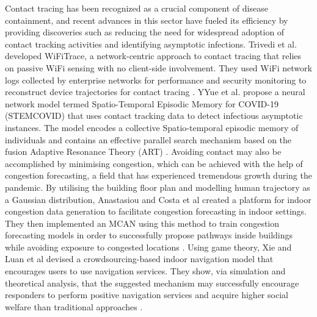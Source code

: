 \documentclass[acmtog]{acmart}
\begin{document}
Contact tracing has been recognized as a crucial component of disease containment, and recent advances in this sector have fueled its efficiency by providing discoveries such as reducing the need for widespread adoption of contact tracking activities and identifying asymptotic infections. Trivedi et al. developed WiFiTrace, a network-centric approach to contact tracing that relies on passive WiFi sensing with no client-side involvement. They used WiFi network logs collected by enterprise networks for performance and security monitoring to reconstruct device trajectories for contact tracing \cite{trivedi2021wifitrace}. YYue et al. propose a neural network model termed Spatio-Temporal Episodic Memory for COVID-19 (STEMCOVID) that uses contact tracking data to detect infectious asymptotic instances. The model encodes a collective Spatio-temporal episodic memory of individuals and contains an effective parallel search mechanism based on the fusion Adaptive Resonance Theory (ART) \cite{hu2020silent}. Avoiding contact may also be accomplished by minimising congestion, which can be achieved with the help of congestion forecasting, a field that has experienced tremendous growth during the pandemic. By utilising the building floor plan and modelling human trajectory as a Gaussian distribution, Anastasiou and Costa et al created a platform for indoor congestion data generation to facilitate congestion forecasting in indoor settings. They then implemented an MCAN using this method to train congestion forecasting models in order to successfully propose pathways inside buildings while avoiding exposure to congested locations \cite{anastasiou2021epicgen}. Using game theory, Xie and Luan et al devised a crowdsourcing-based indoor navigation model that encourages users to use navigation services. They show, via simulation and theoretical analysis, that the suggested mechanism may successfully encourage responders to perform positive navigation services and acquire higher social welfare than traditional approaches \cite{xie2021game}.
\end{document}
